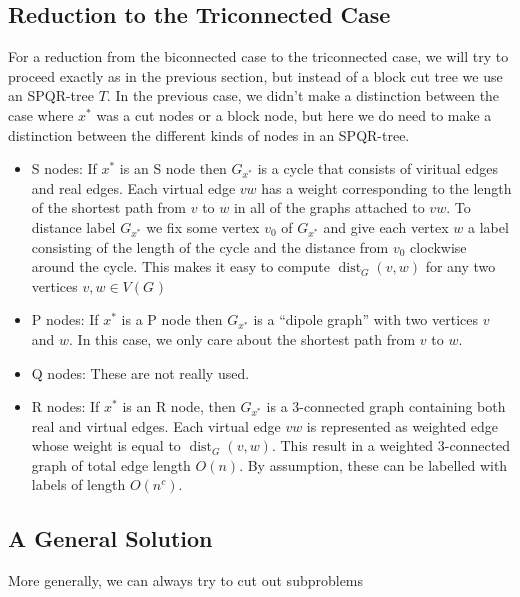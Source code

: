 \documentclass{patmorin}
\DeclareMathOperator{\dist}{dist}
\begin{document}
\subsection{Reduction to the Triconnected Case}

For a reduction from the biconnected case to the triconnected case, we will try to proceed exactly as in the previous section, but instead of a block cut tree we use an SPQR-tree $T$.  In the previous case, we didn't make a distinction between the case where $x^*$ was a cut nodes or a block node, but here we do need to make a distinction between the different kinds of nodes in an SPQR-tree.

\begin{itemize}
    \item S nodes:  If $x^*$ is an S node then $G_{x^*}$ is a cycle that consists of viritual edges and real edges.  Each virtual edge $vw$ has a weight corresponding to the length of the shortest path from $v$ to $w$ in all of the graphs attached to $vw$.  To distance label $G_{x^*}$ we fix some vertex $v_0$ of $G_{x^*}$ and give each vertex $w$ a label consisting of the length of the cycle and the distance from $v_0$ clockwise around the cycle.  This makes it easy to compute $\dist_G(v,w)$ for any two vertices $v,w\in V(G_{})$

    \item P nodes: If $x^*$ is a P node then $G_{x^*}$ is a ``dipole graph'' with two vertices $v$ and $w$. In this case, we only care about the shortest path from $v$ to $w$.

    \item Q nodes: These are not really used.

    \item R nodes: If $x^*$ is an R node, then $G_{x^*}$ is a $3$-connected graph containing both real and virtual edges. Each virtual edge $vw$ is represented as weighted edge whose weight is equal to $\dist_G(v,w)$.  This result in a weighted 3-connected graph of total edge length $O(n)$.  By assumption, these can be labelled with labels of length $O(n^c)$.
\end{itemize}




\subsection{A General Solution}

More generally, we can always try to cut out subproblems








\end{document}
